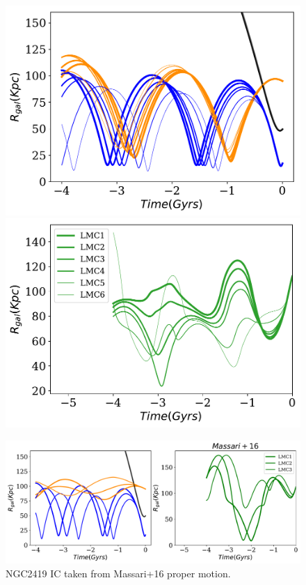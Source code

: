 \documentclass[14pt]{article}
\begin{document}
\begin{figure}[H]
\centering
\begin{minipage}{0.49\linewidth}
\includegraphics[scale=0.5]{../exploratory_code/gal_orbits_all_LMCs.pdf}
\end{minipage}
\begin{minipage}{0.45\linewidth}
\includegraphics[scale=0.5]{../exploratory_code/d_rel_all_LMCs.pdf}
\end{minipage}
\end{figure}


\begin{figure}[H]
\centering
\includegraphics[scale=0.5]{../exploratory_code/gal_orbits_all_LMCs_massari.pdf}
\caption{NGC2419 IC taken from Massari+16 proper motion.}
\end{figure}
\end{document}
